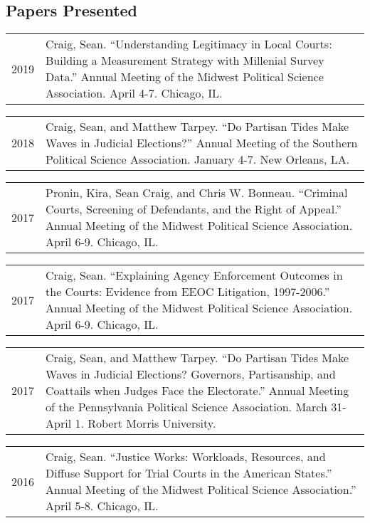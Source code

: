 \documentclass[12pt,letterpaper]{article}
\begin{document}
\subsection*{\sf Papers Presented}
\begin{tabularx}{\textwidth}{@{}DX@{}}
  2019 & Craig, Sean. %
    ``Understanding Legitimacy in Local Courts: Building a Measurement Strategy with Millenial Survey Data.'' %
    Annual Meeting of the Midwest Political Science Association. %
    April 4-7. Chicago, IL.
\end{tabularx} \par\bigskip
\begin{tabularx}{\textwidth}{@{}DX@{}}
  2018 & Craig, Sean, and Matthew Tarpey. %
    ``Do Partisan Tides Make Waves in Judicial Elections?'' %
    Annual Meeting of the Southern Political Science Association. %
    January 4-7. New Orleans, LA.
\end{tabularx} \par\bigskip
\begin{tabularx}{\textwidth}{@{}DX@{}}
  2017 & Pronin, Kira, Sean Craig, and Chris W. Bonneau. %
    ``Criminal Courts, Screening of Defendants, and the Right of Appeal.'' %
    Annual Meeting of the Midwest Political Science Association. %
    April 6-9. Chicago, IL.
\end{tabularx} \par\bigskip
\begin{tabularx}{\textwidth}{@{}DX@{}}
  2017 & Craig, Sean. %
    ``Explaining Agency Enforcement Outcomes in the Courts: %
    Evidence from EEOC Litigation, 1997-2006.'' %
    Annual Meeting of the Midwest Political Science Association. %
    April 6-9. Chicago, IL.
\end{tabularx} \par\bigskip
\begin{tabularx}{\textwidth}{@{}DX@{}}
  2017 & Craig, Sean, and Matthew Tarpey. %
    ``Do Partisan Tides Make Waves in Judicial Elections? %
    Governors, Partisanship, and Coattails when Judges Face the Electorate.'' %
    Annual Meeting of the Pennsylvania Political Science Association. %
    March 31-April 1. Robert Morris University.
\end{tabularx} \par\bigskip
\begin{tabularx}{\textwidth}{@{}DX@{}}
  2016 & Craig, Sean. %
    ``Justice Works: Workloads, Resources, and Diffuse Support for Trial Courts %
    in the American States.'' %
    Annual Meeting of the Midwest Political Science Association.'' %
    April 5-8. Chicago, IL.
\end{tabularx} \par\bigskip
\end{document}
